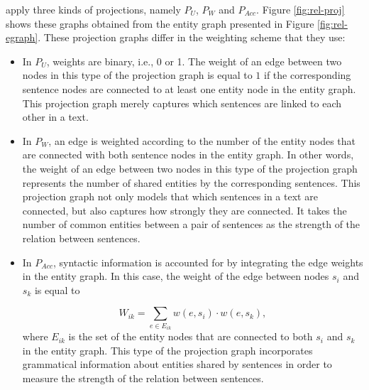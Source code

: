  apply three kinds of projections, namely $P_U$, $P_W$ and $P_{Acc}$. 
Figure \ref{fig:rel-proj} shows these graphs obtained from the entity graph presented in Figure \ref{fig:rel-egraph}. 
These projection graphs differ in the weighting scheme that they use: 

\begin{itemize}

	\item In $P_U$, weights are binary, i.e., 0 or 1. 
	The weight of an edge between two nodes in this type of the projection graph is equal to $1$ if the corresponding sentence nodes are connected to at least one entity node in the entity graph.  
	This projection graph merely captures which sentences are linked to each other in a text. 

	\item In $P_W$, an edge is weighted according to the number of the entity nodes that are connected with both sentence nodes in the entity graph. 
    In other words, the weight of an edge between two nodes in this type of the projection graph represents the number of shared entities by the corresponding sentences. 
    This projection graph not only models that which sentences in a text are connected,  but also captures how strongly they are connected. 
    It takes the number of common entities between a pair of sentences as the strength of the relation between sentences. 

	\item In $P_{Acc}$, syntactic information is accounted for by integrating the edge weights in the entity graph. 
	In this case, the weight of the edge between nodes $s_i$ and $s_k$ is equal to

	\begin{equation}
		W_{ik} = \sum_{e \in E_{ik}}{w(e,s_i) \cdot w(e,s_k)},
	\end{equation}
	where $E_{ik}$ is the set of the entity nodes that are connected to both $s_i$ and $s_k$ in the entity graph.   
	This type of the projection graph incorporates grammatical information about entities shared by sentences in order to measure the strength of the relation between sentences. 

\end{itemize}


